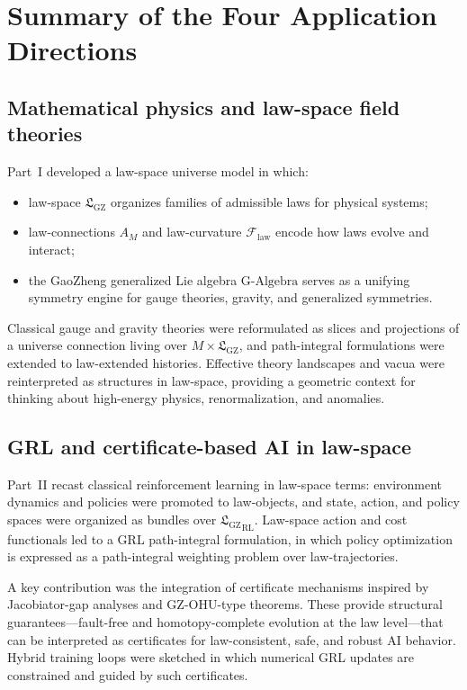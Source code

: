 \documentclass[11pt]{book}
\newcommand{\GAlgebra}{\text{G-Algebra}}
\newcommand{\GZLS}{\ensuremath{\mathfrak{L}_{\mathrm{GZ}}}}
\newcommand{\GZLOC}{\ensuremath{A_M}}
\newcommand{\GZLCurv}{\ensuremath{\mathcal{F}_{\mathrm{law}}}}
\newcommand{\Base}{\ensuremath{M}}
\theoremstyle{plain}
\theoremstyle{definition}
\theoremstyle{remark}
\begin{document}
\section*{Summary of the Four Application Directions}


\subsection*{Mathematical physics and law-space field theories}

Part~I developed a law-space universe model in which:
\begin{itemize}
  \item law-space $\GZLS$ organizes families of admissible laws for
        physical systems;
  \item law-connections $\GZLOC$ and law-curvature $\GZLCurv$ encode
        how laws evolve and interact;
  \item the GaoZheng generalized Lie algebra $\GAlgebra$ serves as a
        unifying symmetry engine for gauge theories, gravity, and
        generalized symmetries.
\end{itemize}
Classical gauge and gravity theories were reformulated as slices and
projections of a universe connection living over
$\Base \times \GZLS$, and path-integral formulations were extended
to law-extended histories. Effective theory landscapes and vacua
were reinterpreted as structures in law-space, providing a geometric
context for thinking about high-energy physics, renormalization, and
anomalies.

\subsection*{GRL and certificate-based AI in law-space}

Part~II recast classical reinforcement learning in law-space terms:
environment dynamics and policies were promoted to law-objects,
and state, action, and policy spaces were organized as bundles over
${\GZLS}_{\mathrm{RL}}$. Law-space action and cost functionals led to
a GRL path-integral formulation, in which policy optimization is
expressed as a path-integral weighting problem over law-trajectories.

A key contribution was the integration of certificate mechanisms
inspired by Jacobiator-gap analyses and GZ-OHU-type theorems. These
provide structural guarantees—fault-free and homotopy-complete
evolution at the law level—that can be interpreted as certificates
for law-consistent, safe, and robust AI behavior. Hybrid training
loops were sketched in which numerical GRL updates are constrained
and guided by such certificates.
\end{document}
